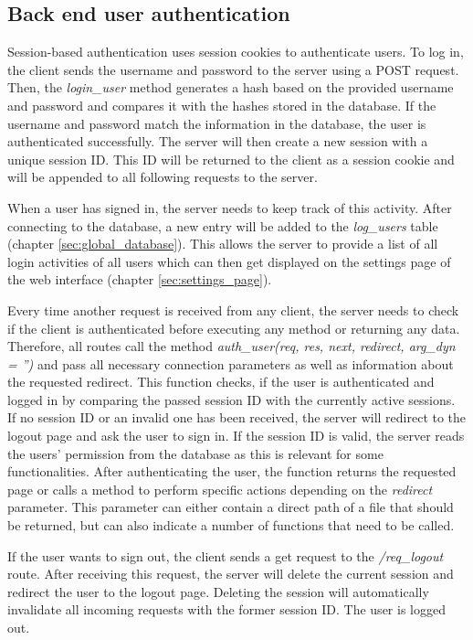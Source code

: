 \subsection{Back end user authentication}
\label{subsec:user_authentication}

Session-based authentication uses session cookies to authenticate users.  To log in, the client sends the username and password to the server using a POST request. Then, the \textit{login\_user} method generates a hash based on the provided username and password and compares it with the hashes stored in the database. If the username and password match the information in the database, the user is authenticated successfully. The server will then create a new session with a unique session ID. This ID will be returned to the client as a session cookie and will be appended to all following requests to the server.

When a user has signed in, the server needs to keep track of this activity. After connecting to the database, a new entry will be added to the \textit{log\_users} table (chapter \ref{sec:global_database}). This allows the server to provide a list of all login activities of all users which can then get displayed on the settings page of the web interface (chapter \ref{sec:settings_page}).

Every time another request is received from any client, the server needs to check if the client is authenticated before executing any method or returning any data. Therefore, all routes call the method \textit{auth\_user(req, res, next, redirect, arg\_dyn = '')} and pass all necessary connection parameters as well as information about the requested redirect. This function checks, if the user is authenticated and logged in by comparing the passed session ID with the currently active sessions. If no session ID or an invalid one has been received, the server will redirect to the logout page and ask the user to sign in.  If the session ID is valid, the server reads the users' permission from the database as this is relevant for some functionalities. After authenticating the user, the function returns the requested page or calls a method to perform specific actions depending on the \textit{redirect} parameter. This parameter can either contain a direct path of a file that should be returned, but can also indicate a number of functions that need to be called.

If the user wants to sign out, the client sends a get request to the \textit{/req\_logout} route. After receiving this request, the server will delete the current session and redirect the user to the logout page. Deleting the session will automatically invalidate all incoming requests with the former session ID. The user is logged out.



